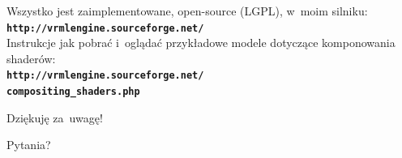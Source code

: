 \documentclass{beamer}
\begin{document}
\begin{frame}[t]

\begin{center}
{\small
Wszystko jest zaimplementowane, open-source (LGPL), w~moim silniku:\\
{\color{blue} \textbf{\texttt{http://vrmlengine.sourceforge.net/}}}\\
Instrukcje jak pobrać i~oglądać przykładowe modele dotyczące komponowania
shaderów:\\
{\color{blue} \textbf{\texttt{http://vrmlengine.sourceforge.net/\\
compositing\_shaders.php}}}}
\end{center}

\vspace{0.25in}

\begin{center}
{\Large Dziękuję za~uwagę!}
\end{center}


\begin{center}
{\Huge \alert{Pytania?}}
\end{center}

\end{frame}
\end{document}
